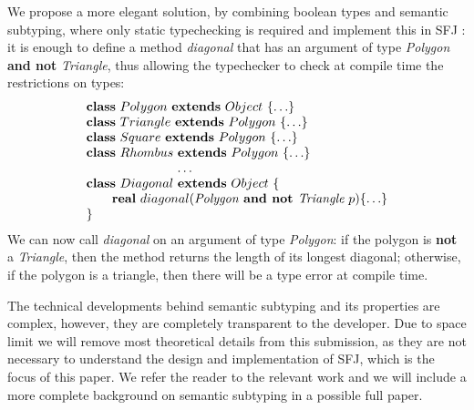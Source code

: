 \documentclass[runningheads]{llncs}
\begin{document}
\begin{example}[Polygons]
We propose a more elegant solution, by combining boolean types and semantic subtyping, where only static typechecking is required and implement this in SFJ \cite{UD20}: it is enough to define a method \emph{diagonal} that has an argument of type \emph{Polygon} \textbf{and not} \emph{Triangle}, thus allowing the typechecker to check at compile time the restrictions on types:
$$
\begin{array}{l}
\mathbf{class} \  Polygon \ \mathbf{extends }\  Object\ \{\ldots\}
\\
\mathbf{class} \  Triangle \ \mathbf{extends }\  Polygon\ \{\ldots\}
\\
\mathbf{class} \  Square \ \mathbf{extends }\  Polygon\ \{\ldots\}
\\
\mathbf{class} \  Rhombus \ \mathbf{extends }\  Polygon\ \{\ldots\}
\\
\hspace{2.5cm} \ldots
\\
\mathbf{class} \  Diagonal \ \mathbf{extends }\  Object\ \{
	\\
	\qquad \mathbf{real}\ diagonal(\textit{Polygon} \textbf{ and not }  \textit{Triangle} \ p)\{\ldots\}
	\\
\}
\end{array}
$$
We can now call \emph{diagonal} on an argument of type \emph{Polygon}: if the polygon is \textbf{not} a \emph{Triangle}, then the method returns the length of its longest diagonal; otherwise, if the polygon is a triangle, then there will be a type error at compile time.
\end{example}

The technical developments behind semantic subtyping and its properties are complex, however, they are completely transparent to the developer.
Due to space limit we will remove most theoretical details from this submission, as they are not necessary to understand the design and implementation of SFJ, which is the focus of this paper. We refer the reader to the relevant work \cite{Dardha2013,Dardha2017} and we will include a more complete background on semantic subtyping in a possible full paper.
\end{document}
